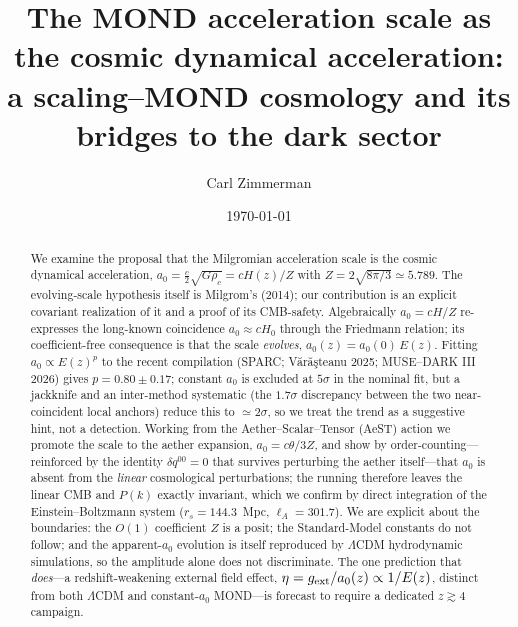 \documentclass[aps,prd,preprint,nofootinbib,floatfix]{revtex4-2}
\begin{document}
\title{The MOND acceleration scale as the cosmic dynamical acceleration:\\
a scaling--MOND cosmology and its bridges to the dark sector}

\author{Carl Zimmerman}
\date{\today}

\begin{abstract}
We examine the proposal that the Milgromian acceleration scale is the cosmic
dynamical acceleration,
$a_0=\tfrac{c}{2}\sqrt{G\rho_c}=cH(z)/Z$ with $Z=2\sqrt{8\pi/3}\simeq5.789$.
The evolving-scale hypothesis itself is Milgrom's (2014); our contribution is an
explicit covariant realization of it and a proof of its CMB-safety. Algebraically
$a_0=cH/Z$ re-expresses the long-known coincidence $a_0\approx cH_0$ through the
Friedmann relation; its coefficient-free consequence is that the scale {\it evolves},
$a_0(z)=a_0(0)\,E(z)$. Fitting $a_0\propto E(z)^p$ to the recent compilation (SPARC;
V\u{a}r\u{a}\c{s}teanu 2025; MUSE--DARK III 2026) gives $p=0.80\pm0.17$; constant $a_0$
is excluded at $5\sigma$ in the nominal fit, but a jackknife and an inter-method
systematic (the $1.7\sigma$ discrepancy between the two near-coincident local anchors)
reduce this to $\simeq2\sigma$, so we treat the trend as a suggestive hint, not a
detection. Working from the Aether--Scalar--Tensor (AeST) action we promote the scale
to the aether expansion, $a_0=c\theta/3Z$, and show by order-counting---reinforced by
the identity $\delta q^{00}=0$ that survives perturbing the aether itself---that $a_0$
is absent from the {\it linear} cosmological perturbations; the running therefore
leaves the linear CMB and $P(k)$ exactly invariant, which we confirm by direct
integration of the Einstein--Boltzmann system ($r_s=144.3$~Mpc, $\ell_A=301.7$). We
are explicit about the boundaries: the $O(1)$ coefficient $Z$ is a posit; the
Standard-Model constants do not follow; and the apparent-$a_0$ evolution is itself
reproduced by $\Lambda$CDM hydrodynamic simulations, so the amplitude alone does not
discriminate. The one prediction that {\it does}---a redshift-weakening external field
effect, $\eta=g_{\rm ext}/a_0(z)\propto1/E(z)$, distinct from both $\Lambda$CDM and
constant-$a_0$ MOND---is forecast to require a dedicated $z\gtrsim4$ campaign.
\end{abstract}

\maketitle
\end{document}
